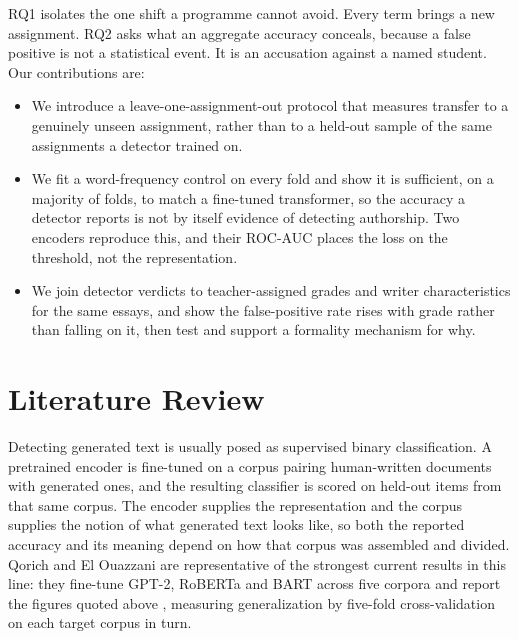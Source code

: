 \documentclass[11pt,a4paper]{article}
\begin{document}
RQ1 isolates the one shift a programme cannot avoid. Every term brings a
new assignment. RQ2 asks what an aggregate accuracy conceals, because a
false positive is not a statistical event. It is an accusation against a
named student. Our contributions are:

\begin{itemize}
\item We introduce a leave-one-assignment-out protocol that measures
transfer to a genuinely unseen assignment, rather than to a held-out
sample of the same assignments a detector trained on.
\item We fit a word-frequency control on every fold and show it is
sufficient, on a majority of folds, to match a fine-tuned transformer,
so the accuracy a detector reports is not by itself evidence of
detecting authorship. Two encoders reproduce this, and their ROC-AUC
places the loss on the threshold, not the representation.
\item We join detector verdicts to teacher-assigned grades and writer
characteristics for the same essays, and show the false-positive rate
rises with grade rather than falling on it, then test and support a
formality mechanism for why.
\end{itemize}

\section{Literature Review}

Detecting generated text is usually posed as supervised binary
classification. A pretrained encoder is fine-tuned on a corpus pairing
human-written documents with generated ones, and the resulting classifier
is scored on held-out items from that same corpus. The encoder supplies
the representation and the corpus supplies the notion of what generated
text looks like, so both the reported accuracy and its meaning depend on
how that corpus was assembled and divided. Qorich and El Ouazzani are
representative of the strongest current results in this line: they
fine-tune GPT-2, RoBERTa and BART across five corpora and report the
figures quoted above \cite{qorich2025}, measuring generalization by
five-fold cross-validation on each target corpus in turn.
\end{document}
